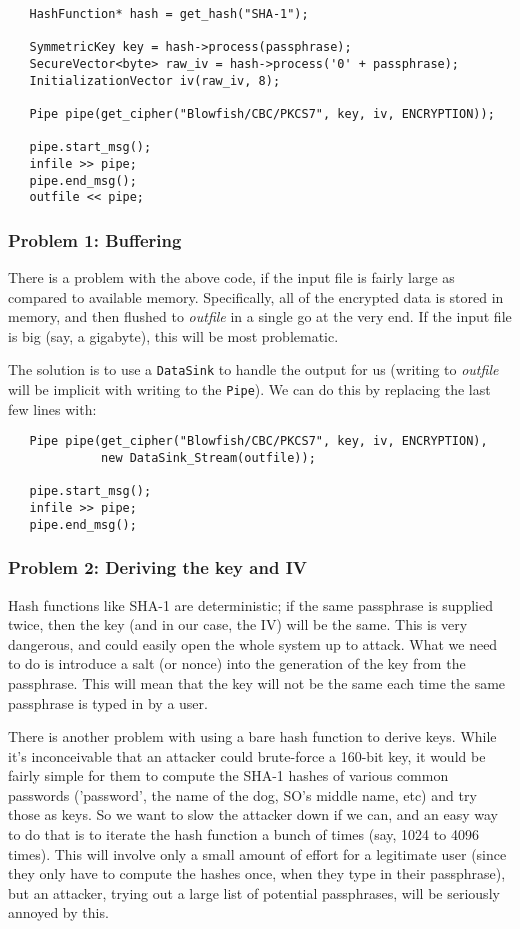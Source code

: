 \documentclass{article}
\newcommand{\type}[1]{\texttt{#1}}
\renewcommand{\arg}[1]{\textsl{#1}}
\newcommand{\variable}[1]{\textsl{#1}}
\begin{document}
\begin{verbatim}
   HashFunction* hash = get_hash("SHA-1");

   SymmetricKey key = hash->process(passphrase);
   SecureVector<byte> raw_iv = hash->process('0' + passphrase);
   InitializationVector iv(raw_iv, 8);

   Pipe pipe(get_cipher("Blowfish/CBC/PKCS7", key, iv, ENCRYPTION));

   pipe.start_msg();
   infile >> pipe;
   pipe.end_msg();
   outfile << pipe;
\end{verbatim}

\subsubsection{Problem 1: Buffering}

There is a problem with the above code, if the input file is fairly large as
compared to available memory. Specifically, all of the encrypted data is stored
in memory, and then flushed to \variable{outfile} in a single go at the very
end. If the input file is big (say, a gigabyte), this will be most problematic.

The solution is to use a \type{DataSink} to handle the output for us (writing
to \arg{outfile} will be implicit with writing to the \type{Pipe}). We can do
this by replacing the last few lines with:

\begin{verbatim}
   Pipe pipe(get_cipher("Blowfish/CBC/PKCS7", key, iv, ENCRYPTION),
             new DataSink_Stream(outfile));

   pipe.start_msg();
   infile >> pipe;
   pipe.end_msg();
\end{verbatim}

\subsubsection{Problem 2: Deriving the key and IV}

Hash functions like SHA-1 are deterministic; if the same passphrase is supplied
twice, then the key (and in our case, the IV) will be the same. This is very
dangerous, and could easily open the whole system up to attack. What we need to
do is introduce a salt (or nonce) into the generation of the key from the
passphrase. This will mean that the key will not be the same each time the same
passphrase is typed in by a user.

There is another problem with using a bare hash function to derive keys. While
it's inconceivable that an attacker could brute-force a 160-bit key, it would
be fairly simple for them to compute the SHA-1 hashes of various common
passwords ('password', the name of the dog, SO's middle name, etc) and try
those as keys. So we want to slow the attacker down if we can, and an easy way
to do that is to iterate the hash function a bunch of times (say, 1024 to 4096
times). This will involve only a small amount of effort for a legitimate user
(since they only have to compute the hashes once, when they type in their
passphrase), but an attacker, trying out a large list of potential passphrases,
will be seriously annoyed by this.
\end{document}
